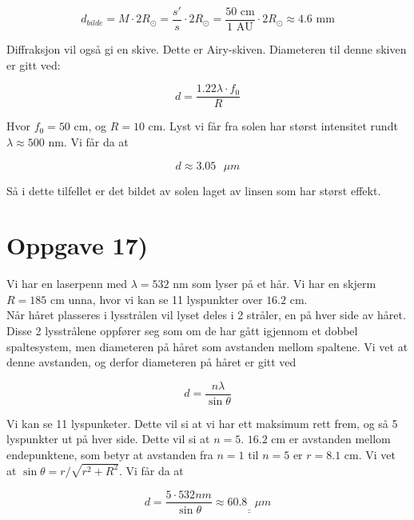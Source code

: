 \documentclass[a4paper,norsk, 10pt]{article}
\begin{document}
\begin{equation}
d_{bilde} = M\cdot 2R_{\odot} = \frac{s'}{s}\cdot 2R_{\odot} = \frac{50 \text{ cm}}{1 \text{ AU}}\cdot 2R_{\odot} \approx 4.6 \text{ mm}
\end{equation}

Diffraksjon vil også gi en skive. Dette er Airy-skiven. Diameteren til denne skiven er gitt ved:

\begin{equation}
d = \frac{1.22\lambda\cdot f_0}{R}
\end{equation}

Hvor $f_0 = 50$ cm, og $R = 10$ cm. Lyst vi får fra solen har størst intensitet rundt $\lambda \approx 500$ nm. Vi får da at

\begin{equation}
d \approx 3.05 \text{ }\mu m
\end{equation}

Så i dette tilfellet er det bildet av solen laget av linsen som har størst effekt.


\section*{Oppgave 17)}

Vi har en laserpenn med $\lambda = 532$ nm som lyser på et hår. Vi har en skjerm $ R = 185$ cm unna, hvor vi kan se 11 lyspunkter over $16.2$ cm. \\

Når håret plasseres i lysstrålen vil lyset deles i 2 stråler, en på hver side av håret. Disse 2 lysstrålene oppfører seg som om de har gått igjennom et dobbel spaltesystem, men diameteren på håret som avstanden mellom spaltene. Vi vet at denne avstanden, og derfor diameteren på håret er gitt ved

\begin{equation}
d = \frac{n\lambda}{\sin\theta} 
\end{equation}

Vi kan se 11 lyspunketer. Dette vil si at vi har ett maksimum rett frem, og så 5 lyspunkter ut på hver side. Dette vil si at $n = 5$. $16.2$ cm er avstanden mellom endepunktene, som betyr at avstanden fra $n = 1$ til $n = 5$ er $r = 8.1$ cm. Vi vet at $\sin \theta = r/\sqrt{r^2 + R^2}$. Vi får da at

\begin{equation}
 d = \frac{5\cdot 532 nm}{\sin\theta} \approx \underline{\underline{60.8 \text{ }\mu m}}
 \end{equation} 
\end{document}
